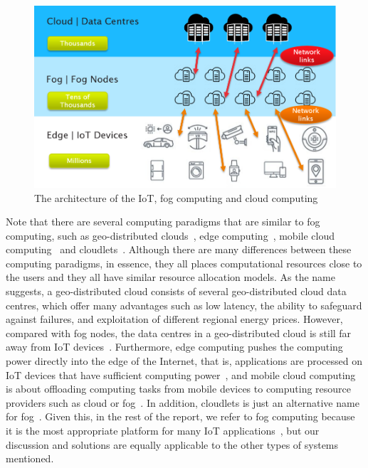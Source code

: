 \documentclass[11pt]{phdthesis}
\newcommand{\source}[1]{\caption*{Source: {#1}} }
\begin{document}
\begin{figure}[!htb]
	\center
	\includegraphics[width=0.9\linewidth]{./Figures/Cisco-fog.png}
	\caption[Caption for LOF]{The architecture of the IoT, fog computing and cloud computing\protect\footnotemark}
	\label{fig: fog computing}
\end{figure}


Note that there are several computing paradigms that are similar to fog computing, such as geo-distributed clouds~\citep{narayanan2014towards}, edge computing~\citep{garcia2015edge}, mobile cloud computing~\citep{fernando2013mobile} and cloudlets~\citep{satyanarayanan2009case}. Although there are many differences between these computing paradigms, in essence, they all places computational resources close to the users and they all have similar resource allocation models.
As the name suggests, a geo-distributed cloud consists of several geo-distributed cloud data centres, which offer many advantages such as low latency, the ability to safeguard against failures, and exploitation of different regional energy prices. However, compared with fog nodes, the data centres in a geo-distributed cloud is still far away from IoT devices~\citep{narayanan2014towards}. Furthermore, edge computing pushes the computing power directly into the edge of the Internet, that is, applications are processed on IoT devices that have sufficient computing power~\citep{garcia2015edge}, and mobile cloud computing is about offloading computing tasks from mobile devices to computing resource providers such as cloud or fog~\citep{fernando2013mobile}. In addition, cloudlets is just an alternative name for fog~\citep{satyanarayanan2009case}. Given this, in the rest of the report, we refer to fog computing because it is the most appropriate platform for many IoT applications~\citep{bonomi2012fog}, but our discussion and solutions are equally applicable to the other types of systems mentioned.
\end{document}

